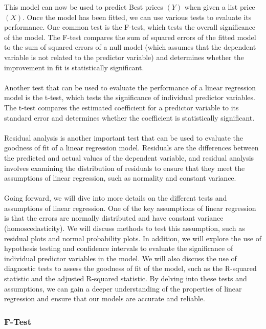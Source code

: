 \documentclass{article}[12pt]
\theoremstyle{definition}
\begin{document}
\noindent
 This model can now be used to predict Best prices $(Y) $ when given a list price $(X)$. Once the model has been fitted, we can use various tests to evaluate its performance. One common test is the F-test, which tests the overall significance of the model. The F-test compares the sum of squared errors of the fitted model to the sum of squared errors of a null model (which assumes that the dependent variable is not related to the predictor variable) and determines whether the improvement in fit is statistically significant.
\\
\\
Another test that can be used to evaluate the performance of a linear regression model is the t-test, which tests the significance of individual predictor variables. The t-test compares the estimated coefficient for a predictor variable to its standard error and determines whether the coefficient is statistically significant.
\\
\\
Residual analysis is another important test that can be used to evaluate the goodness of fit of a linear regression model. Residuals are the differences between the predicted and actual values of the dependent variable, and residual analysis involves examining the distribution of residuals to ensure that they meet the assumptions of linear regression, such as normality and constant variance.
\\
\\
Going forward, we will dive into more details on the different tests and assumptions of linear regression. One of the key assumptions of linear regression is that the errors are normally distributed and have constant variance (homoscedasticity). We will discuss methods to test this assumption, such as residual plots and normal probability plots. In addition, we will explore the use of hypothesis testing and confidence intervals to evaluate the significance of individual predictor variables in the model. We will also discuss the use of diagnostic tests to assess the goodness of fit of the model, such as the R-squared statistic and the adjusted R-squared statistic. By delving into these tests and assumptions, we can gain a deeper understanding of the properties of linear regression and ensure that our models are accurate and reliable.

\newpage

\bigskip

\subsubsection{F-Test}
\end{document}
